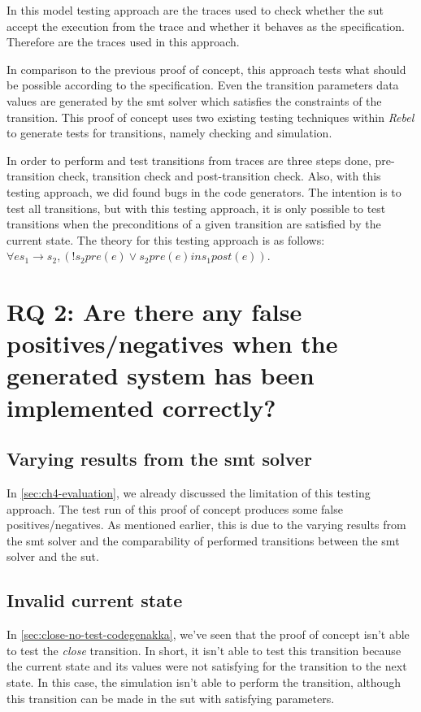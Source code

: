 In this model testing approach are the traces used to check whether the \gls{sut} accept the execution from the trace and whether it behaves as the specification. Therefore are the traces used in this approach.

In comparison to the previous proof of concept, this approach tests what should be possible according to the specification. Even the transition parameters data values are generated by the \gls{smt} solver which satisfies the constraints of the transition. This proof of concept uses two existing testing techniques within \textit{Rebel} to generate tests for transitions, namely checking and simulation.

In order to perform and test transitions from traces are three steps done, pre-transition check, transition check and post-transition check. Also, with this testing approach, we did found bugs in the code generators. The intention is to test all transitions, but with this testing approach, it is only possible to test transitions when the preconditions of a given transition are satisfied by the current state. The theory for this testing approach is as follows: $\forall e s_{1} \to s_{2}, (! s_{2} pre(e) \lor s_{2} pre(e) in s_{1} post(e))$.

\section{RQ 2: Are there any false positives/negatives when the generated system has been implemented correctly?}

\subsection{Varying results from the \gls{smt} solver}
In \autoref{sec:ch4-evaluation}, we already discussed the limitation of this testing approach. The test run of this proof of concept produces some false positives/negatives. As mentioned earlier, this is due to the varying results from the \gls{smt} solver and the comparability of performed transitions between the \gls{smt} solver and the \gls{sut}.


\subsection{Invalid current state}
In \autoref{sec:close-no-test-codegenakka}, we've seen that the proof of concept isn't able to test the \textit{close} transition. In short, it isn't able to test this transition because the current state and its values were not satisfying for the transition to the next state. In this case, the simulation isn't able to perform the transition, although this transition can be made in the \gls{sut} with satisfying parameters.

